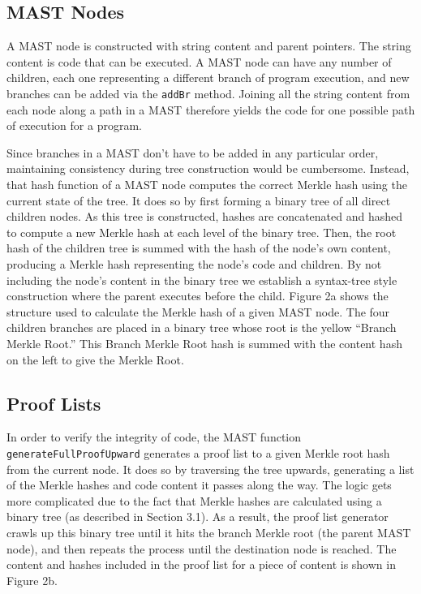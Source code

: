\documentclass{vldb}
\begin{document}
\subsection{MAST Nodes}

A MAST node is constructed with string content and parent pointers.
The string content is code that can be executed. A MAST node can have
any number of children, each one representing a different branch of program
execution, and new branches can be added via the \texttt{addBr} method. Joining all the
string content from each node along a path in a MAST therefore yields the code
for one possible path of execution for a program.
 
Since branches in a MAST don’t have to be added in any particular order,
maintaining consistency during tree construction would be cumbersome. Instead,
that hash function of a MAST node computes the correct Merkle hash using the
current state of the tree. It does so by first forming a binary tree of all
direct children nodes. As this tree is constructed, hashes are concatenated and
hashed to compute a new Merkle hash at each level of the binary tree. Then, the
root hash of the children tree is summed with the hash of the node’s own
content, producing a Merkle hash representing the node's code and children. By
not including the node's content in the binary tree we establish a syntax-tree
style construction where the parent executes before the child. Figure 2a shows
the structure used to calculate the Merkle hash of a given MAST node. The four
children branches are placed in a binary tree whose root is the yellow ``Branch
Merkle Root.'' This Branch Merkle Root hash is summed with the content hash on
the left to give the Merkle Root.

\subsection{Proof Lists}

In order to verify the integrity of code, the MAST function
\texttt{generateFullProofUpward}  generates a proof list to a given Merkle root
hash from the current node. It does so by traversing the tree upwards,
generating a list of the Merkle hashes and code content it passes along the
way. The logic gets more complicated due to the fact that Merkle hashes are
calculated using a binary tree (as described in Section 3.1). As a result, the
proof list generator crawls up this binary tree until it hits the branch Merkle
root (the parent MAST node), and then repeats the process until the destination
node is reached. The content and hashes included in the proof list for a piece
of content is shown in Figure 2b.
\end{document}
